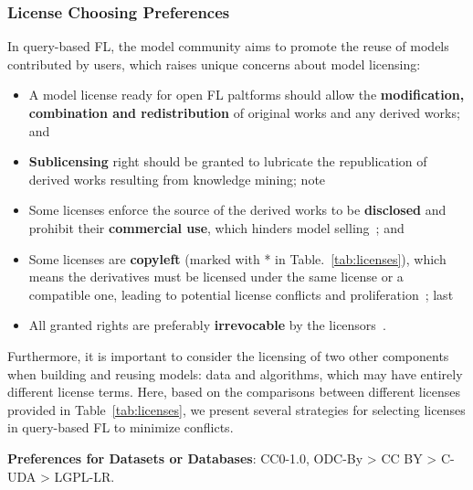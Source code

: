 
\subsubsection{License Choosing Preferences}
\label{sec:choosing}
In query-based FL, the model community aims to promote the reuse of models contributed by users, which raises unique concerns about model licensing:
\begin{itemize}
  \item A model license ready for open FL paltforms should allow the \textbf{modification, combination and redistribution} of original works and any derived works; and
  \item \textbf{Sublicensing} right should be granted to lubricate the republication of derived works resulting from knowledge mining; note
  \item Some licenses enforce the source of the derived works to be \textbf{disclosed} and prohibit their \textbf{commercial use}, which hinders model selling~\cite{chen2019towards}; and
  \item Some licenses are \textbf{copyleft} (marked with * in Table.~\ref{tab:licenses}), which means the derivatives must be licensed under the same license or a compatible one, leading to potential license conflicts and proliferation~\cite{gomulkiewicz2009open}; last
  \item All granted rights are preferably \textbf{irrevocable} by the licensors~\cite{reddy2009jacobsen}.
\end{itemize}

Furthermore, it is important to consider the licensing of two other components when building and reusing models: data and algorithms, which may have entirely different license terms. 
Here, based on the comparisons between different licenses provided in Table~\ref{tab:licenses}, we present several strategies for selecting licenses in query-based FL to minimize conflicts.

\textbf{Preferences for Datasets or Databases}: CC0-1.0, ODC-By > CC BY > C-UDA > LGPL-LR.
   
